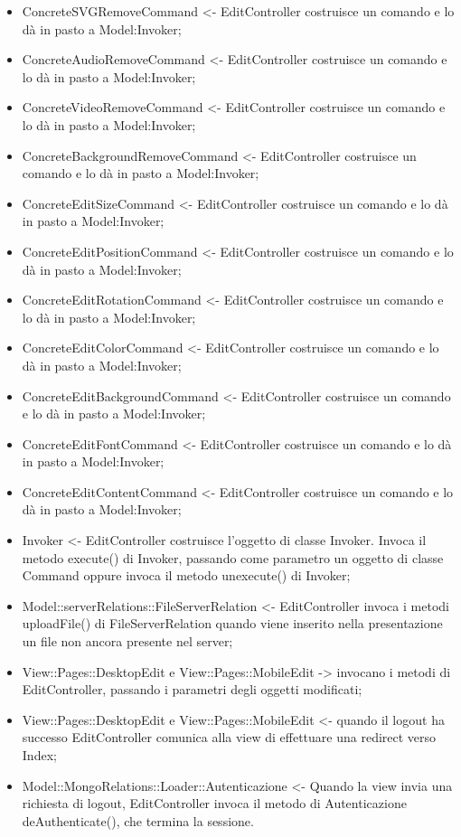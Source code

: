 {{\begin{itemize}
			\item ConcreteSVGRemoveCommand <- EditController costruisce un comando e lo dà in pasto a Model:Invoker;
			\item ConcreteAudioRemoveCommand <- EditController costruisce un comando e lo dà in pasto a Model:Invoker;
			\item ConcreteVideoRemoveCommand <- EditController costruisce un comando e lo dà in pasto a Model:Invoker;
			\item ConcreteBackgroundRemoveCommand <- EditController costruisce un comando e lo dà in pasto a Model:Invoker;
			\item ConcreteEditSizeCommand <- EditController costruisce un comando e lo dà in pasto a Model:Invoker;
			\item ConcreteEditPositionCommand <- EditController costruisce un comando e lo dà in pasto a Model:Invoker;
			\item ConcreteEditRotationCommand <- EditController costruisce un comando e lo dà in pasto a Model:Invoker;
			\item ConcreteEditColorCommand <- EditController costruisce un comando e lo dà in pasto a Model:Invoker;
			\item ConcreteEditBackgroundCommand <- EditController costruisce un comando e lo dà in pasto a Model:Invoker;
			\item ConcreteEditFontCommand <- EditController costruisce un comando e lo dà in pasto a Model:Invoker;
			\item ConcreteEditContentCommand <- EditController costruisce un comando e lo dà in pasto a Model:Invoker;
			\item Invoker <- EditController costruisce l’oggetto di classe Invoker. Invoca il metodo execute() di Invoker, passando come parametro un oggetto di classe Command oppure invoca il metodo unexecute() di Invoker;
			\item Model::\-serverRelations::\-FileServerRelation <- EditController invoca i metodi uploadFile() di FileServerRelation quando viene inserito nella presentazione un file non ancora presente nel server;
			\item View::\-Pages::\-DesktopEdit e View::\-Pages::\-MobileEdit -> invocano i metodi di EditController, passando i parametri degli oggetti modificati;
			\item View::\-Pages::\-DesktopEdit e View::\-Pages::\-MobileEdit <- quando il logout ha successo EditController comunica alla view di effettuare una redirect verso Index;
			\item Model::\-MongoRelations::\-Loader::\-Autenticazione <- Quando la view invia una richiesta di logout, EditController invoca il metodo di Autenticazione deAuthenticate(), che termina la sessione.

\end{itemize}}}
